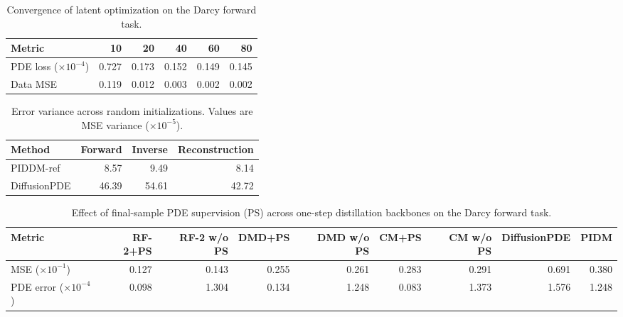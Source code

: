 \documentclass{article}
\theoremstyle{plain}
\theoremstyle{definition}
\theoremstyle{remark}
\begin{document}
\begin{table}[!htbp]
\centering
\setlength{\tabcolsep}{5pt}
\renewcommand{\arraystretch}{1.15}
\caption{Convergence of latent optimization on the Darcy forward task.}
\label{tab:appendix_latent_convergence}
\begin{tabular}{lrrrrr}
\toprule
Metric & 10 & 20 & 40 & 60 & 80 \\
\midrule
PDE loss ($\times 10^{-4}$) & 0.727 & 0.173 & 0.152 & 0.149 & 0.145 \\
Data MSE & 0.119 & 0.012 & 0.003 & 0.002 & 0.002 \\
\bottomrule
\end{tabular}
\end{table}

\begin{table}[!htbp]
\centering
\setlength{\tabcolsep}{5pt}
\renewcommand{\arraystretch}{1.15}
\caption{Error variance across random initializations. Values are MSE variance ($\times 10^{-5}$).}
\label{tab:appendix_latent_variance}
\begin{tabular}{lrrr}
\toprule
Method & Forward & Inverse & Reconstruction \\
\midrule
PIDDM-ref & 8.57 & 9.49 & 8.14 \\
DiffusionPDE & 46.39 & 54.61 & 42.72 \\
\bottomrule
\end{tabular}
\end{table}

\begin{table}[!htbp]
\scriptsize
\centering
\setlength{\tabcolsep}{3pt}
\renewcommand{\arraystretch}{1.15}
\caption{Effect of final-sample PDE supervision (PS) across one-step distillation backbones on the Darcy forward task.}
\label{tab:appendix_final_sample_supervision}
\begin{tabular}{lrrrrrrrr}
\toprule
Metric & RF-2+PS & RF-2 w/o PS & DMD+PS & DMD w/o PS & CM+PS & CM w/o PS & DiffusionPDE & PIDM \\
\midrule
MSE ($\times 10^{-1}$) & 0.127 & 0.143 & 0.255 & 0.261 & 0.283 & 0.291 & 0.691 & 0.380 \\
PDE error ($\times 10^{-4}$) & 0.098 & 1.304 & 0.134 & 1.248 & 0.083 & 1.373 & 1.576 & 1.248 \\
\bottomrule
\end{tabular}
\end{table}

\FloatBarrier
\end{document}
